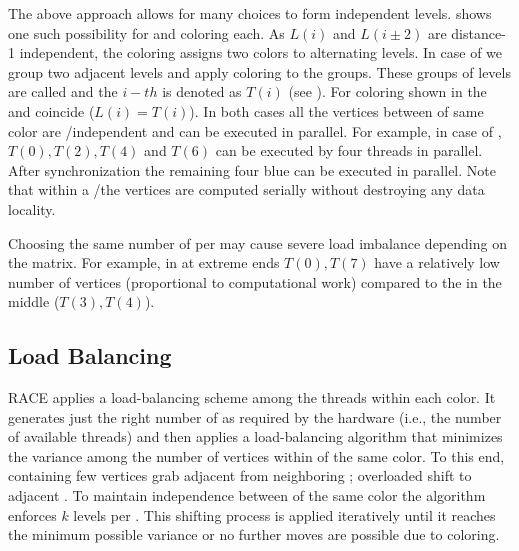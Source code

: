   \setlength{\belowcaptionskip}{0pt}
The above approach allows for many choices to form \DK independent levels.  shows 
one such possibility for \DONE and \DTWO coloring each. As $L(i)$ and $L(i\pm2)$ are
distance-1 independent, the \DONE coloring  assigns
two colors to alternating levels.  In case of \DTWO we group two adjacent levels and apply \DONE
coloring to the groups. These groups of levels are called \levelGroups
 and the $i-th$ \levelGroup is denoted as $T(i)$ (see ).
For \DONE coloring shown in  the \levels and \levelGroups
coincide ($L(i) = T(i)$).
In both cases
 all the vertices  between \levelGroups of same color
  are \DONE/\DTWO independent  and can be executed in parallel.
   For example, in case of \DTWO, \levelGroups $T(0), T(2), T(4)$
 and $T(6)$ can be executed by four threads in parallel. After synchronization the remaining 
 four blue \levelGroups can be executed in parallel. Note that
 within a \levelGroup/\level the vertices are computed serially without destroying
 any data locality.

Choosing the same number of \levels per \levelGroup may cause severe
load imbalance depending on the matrix. For example, in  
 \levelGroups at extreme ends $T(0), T(7)$  have a relatively low number of 
 vertices (proportional to computational work)  compared to the \levelGroups 
 in the middle ($T(3),T(4)$).


\subsection{Load Balancing}
\Acrshort{RACE} applies a load-balancing scheme 
among the threads within each color.
It generates just the right number of \levelGroups 
as required by the hardware (i.e., the number of available threads)
and then applies a load-balancing algorithm that
minimizes the variance among the number of vertices 
within \levelGroups of the same color. To this end,
\levelGroups containing few vertices
grab adjacent \levels from neighboring \levelGroups; overloaded
\levelGroups shift \levels to adjacent \levelGroups. To maintain
\DK independence between \levelGroups of the same color the algorithm enforces \atleast $k$ levels per \levelGroup. This shifting process is applied iteratively until it
reaches the minimum possible variance or no further moves are possible due to
 \DK coloring.
 
